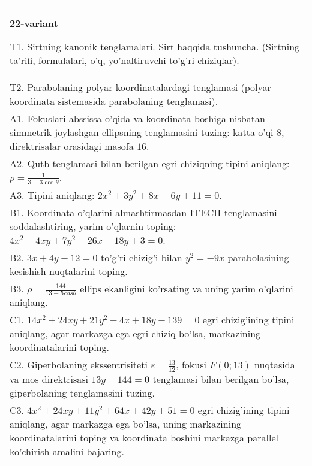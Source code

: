 \documentclass{article}
\begin{document}
\begin{tabular}{m{17cm}}
\textbf{22-variant}
\newline

T1. Sirtning kanonik tenglamalari. Sirt haqqida tushuncha. (Sirtning ta'rifi, formulalari, o'q, yo'naltiruvchi to'g'ri chiziqlar).\\

T2. Parabolaning polyar koordinatalardagi tenglamasi (polyar koordinata sistemasida parabolaning tenglamasi).\\

A1. Fokuslari abssissa o'qida va koordinata boshiga nisbatan simmetrik joylashgan ellipsning tenglamasini tuzing: katta o'qi $8$, direktrisalar orasidagi masofa $16$.\\

A2. Qutb tenglamasi bilan berilgan egri chiziqning tipini aniqlang: $\rho=\frac{1}{3-3\cos\theta}$.\\

A3. Tipini aniqlang: $2x^{2}+3y^{2}+8x-6y+11=0$.\\

B1. Koordinata o'qlarini almashtirmasdan ITECH tenglamasini soddalashtiring, yarim o'qlarnin toping: $4x^{2} - 4xy + 7y^{2} - 26x - 18y + 3 = 0$.\\

B2. $3x + 4y - 12 = 0$ to'g'ri chizig'i bilan $y^{2} = - 9x$ parabolasining kesishish nuqtalarini toping.  \\

B3. $\rho = \frac{144}{13 - 5cos\theta}$ ellips ekanligini ko'rsating va uning yarim o'qlarini aniqlang.\\

C1. $14x^{2} + 24xy + 21y^{2} - 4x + 18y - 139 = 0$ egri chizig'ining tipini aniqlang, agar markazga ega egri chiziq bo'lsa, markazining koordinatalarini toping.  \\

C2. Giperbolaning ekssentrisiteti $\varepsilon = \frac{13}{12}$, fokusi $F(0;13)$ nuqtasida va mos direktrisasi $13y - 144 = 0$ tenglamasi bilan berilgan bo'lsa, giperbolaning tenglamasini tuzing.  \\

C3. $4x^{2} + 24xy + 11y^{2} + 64x + 42y + 51 = 0$ egri chizig'ining tipini aniqlang, agar markazga ega bo'lsa, uning markazining koordinatalarini toping va koordinata boshini markazga parallel ko'chirish amalini bajaring.\\

\end{tabular}
\vspace{1cm}
\end{document}
